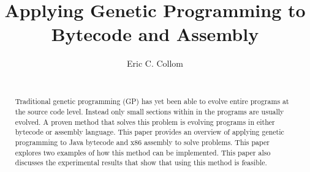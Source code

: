 \documentclass{sig-alternate}
\begin{document}
%

\title{Applying Genetic Programming to \\ Bytecode and Assembly}
%
%
%
%
%
%
\author{
%
%
\alignauthor
Eric C. Collom \\
 \\
}

\maketitle
\begin{abstract}
Traditional genetic programming (GP) has yet been able to evolve entire programs at the source code level. Instead only small sections within in the programs are usually evolved. A proven method that solves this problem is evolving programs in either bytecode or assembly language. This paper provides an overview of applying genetic programming to Java bytecode and x86 assembly to solve problems. This paper explores two examples of how this method can be implemented. This paper also discusses the experimental results that show that using this method is feasible.
\end{abstract}
\end{document}
